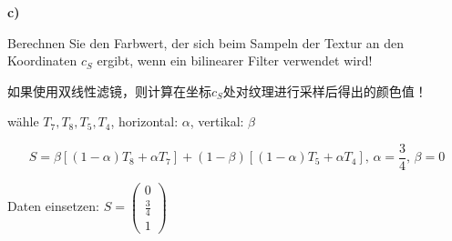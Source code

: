 \documentclass[fleqn]{article}
\begin{document}
\noindent\textbf{c)}

Berechnen Sie den Farbwert, der sich beim Sampeln der Textur an den Koordinaten $c_S$ ergibt, wenn ein bilinearer Filter verwendet wird!

如果使用双线性滤镜，则计算在坐标$ c_S $处对纹理进行采样后得出的颜色值！

wähle $T_7,T_8,T_5,T_4$, horizontal: $\alpha$, vertikal: $\beta$

$$S=\beta[(1-\alpha)T_8+\alpha T_7]+(1-\beta)[(1-\alpha)T_5+\alpha T_4],\,\alpha=\frac{3}{4},\,\beta=0$$

Daten einsetzen: $S=\begin{pmatrix}
    0\\\frac{3}{4}\\1
\end{pmatrix}$
\end{document}
